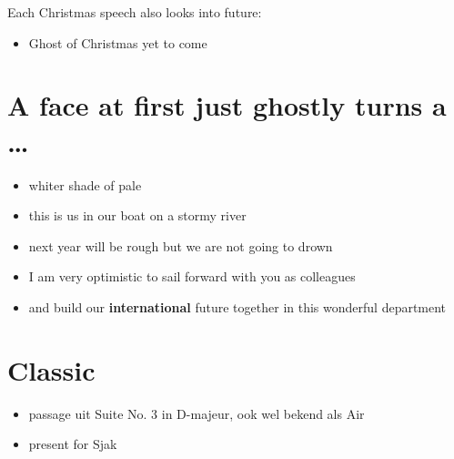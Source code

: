 \documentclass[a4paper,12pt]{article}
\begin{document}
Each Christmas speech also looks into future:
\begin{itemize}
\item Ghost of Christmas yet to come
\end{itemize}
\section*{A face at first just ghostly turns a \ldots{}}
\label{sec:org84baa17}
\begin{itemize}
\item whiter shade of pale
\item this is us in our boat on a stormy river
\item next year will be rough but we are not going to drown
\item I am very optimistic to sail forward with you as colleagues
\item and build our \textbf{international} future together in this wonderful department
\end{itemize}
\section*{Classic}
\label{sec:org7889655}
\begin{itemize}
\item passage uit Suite No. 3 in D-majeur, ook wel bekend als Air
\item present for Sjak
\end{itemize}
\end{document}
